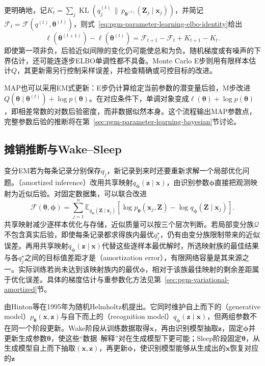更明确地，记$K_t=\sum_j\operatorname{KL}(q_j^{(t)}\,\|\,p_{\bm{\theta}^{(t)}}(\bm{Z}_j\mid\bm{x}_j))$，并简记$\mathcal{F}_t=\mathcal{F}(q^{(t)},\bm{\theta}^{(t)})$，则式~\eqref{eq:pgm-parameter-learning-elbo-identity}给出
\[
  \ell(\bm{\theta}^{(t+1)})-\ell(\bm{\theta}^{(t)})
  =\mathcal{F}_{t+1}-\mathcal{F}_t+K_{t+1}-K_t.
\]
即使第一项非负，后验近似间隙的变化仍可能使总和为负。随机梯度或有噪声的下界估计，还可能连逐步ELBO单调性都不具备。Monte Carlo E步则用有限样本估计$Q$，其更新需另行控制采样误差，并检查精确或可控目标的改进。

MAP也可以采用EM式更新：E步仍计算给定当前参数的潜变量后验，M步改进$Q(\bm{\theta}\mid\bm{\theta}^{(t)})+\log p(\bm{\theta})$。在对应条件下，单调对象变成$\ell(\bm{\theta})+\log p(\bm{\theta})$，即相差常数的对数后验密度，而非数据似然本身。这个流程输出MAP参数点，完整参数后验的推断将在第~\ref{sec:pgm-parameter-learning-bayesian}节讨论。

\subsection{摊销推断与Wake--Sleep}
\label{sec:pgm-parameter-learning-amortized}

变分EM若为每条记录分别保存$q_j$，新记录到来时还要重新求解一个局部优化问题。（amortized inference）改用共享映射$q_{\bm{\phi}}(\bm{z}\mid\bm{x})$，由识别参数$\bm{\phi}$直接把观测映射为近似后验。对固定数据集，可以联合改进
\[
  \mathcal{F}(\bm{\theta},\bm{\phi})
  =\sum_{j=1}^n\mathbb{E}_{q_{\bm{\phi}}(\bm{Z}\mid\bm{x}_j)}
    [\log p_{\bm{\theta}}(\bm{x}_j,\bm{Z})
     -\log q_{\bm{\phi}}(\bm{Z}\mid\bm{x}_j)].
\]
共享映射减少逐样本优化与存储，近似质量可以按三个层次判断。若局部变分族$\mathcal{Q}$不包含真实后验，即使每条记录都求得族内最优$q_j^\star$，仍有由变分族限制带来的近似误差。再用共享映射$q_{\bm{\phi}}(\bm{z}\mid\bm{x})$代替这些逐样本最优解时，所选映射族的最佳结果与各$q_j^\star$之间的目标值差距才是（amortization error），有限网络容量是其来源之一。实际训练若尚未达到该映射族内的最优$\bm{\phi}$，相对于该族最佳映射的剩余差距属于优化误差。具体的梯度估计与重参数化方法见第~\ref{sec:pgm-variational-amortized}节。

由Hinton等在1995年为随机Helmholtz机提出。它同时维护自上而下的（generative model）$p_{\bm{\theta}}(\bm{x},\bm{z})$与自下而上的（recognition model）$q_{\bm{\phi}}(\bm{z}\mid\bm{x})$，但两组参数不在同一个阶段更新。Wake阶段从训练数据取得$\bm{x}$，再由识别模型抽取$\bm{z}$，固定$\bm{\phi}$并更新生成参数$\bm{\theta}$，使这些“数据--解释”对在生成模型下更可能；Sleep阶段固定$\bm{\theta}$，从生成模型自上而下抽取$(\bm{x},\bm{z})$，再更新$\bm{\phi}$，使识别模型能够从生成出的$\bm{x}$恢复对应的$\bm{z}$

